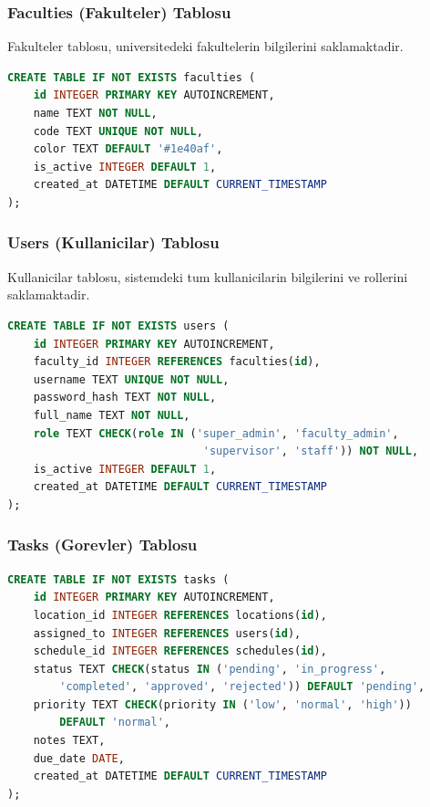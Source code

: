 \subsubsection{Faculties (Fakulteler) Tablosu}
\label{subsubsec:faculties}

Fakulteler tablosu, universitedeki fakultelerin bilgilerini 
saklamaktadir.

\begin{lstlisting}[language=SQL, caption={Faculties Tablosu Semasi}]
CREATE TABLE IF NOT EXISTS faculties (
    id INTEGER PRIMARY KEY AUTOINCREMENT,
    name TEXT NOT NULL,
    code TEXT UNIQUE NOT NULL,
    color TEXT DEFAULT '#1e40af',
    is_active INTEGER DEFAULT 1,
    created_at DATETIME DEFAULT CURRENT_TIMESTAMP
);
\end{lstlisting}

\subsubsection{Users (Kullanicilar) Tablosu}
\label{subsubsec:users}

Kullanicilar tablosu, sistemdeki tum kullanicilarin bilgilerini 
ve rollerini saklamaktadir.

\begin{lstlisting}[language=SQL, caption={Users Tablosu Semasi}]
CREATE TABLE IF NOT EXISTS users (
    id INTEGER PRIMARY KEY AUTOINCREMENT,
    faculty_id INTEGER REFERENCES faculties(id),
    username TEXT UNIQUE NOT NULL,
    password_hash TEXT NOT NULL,
    full_name TEXT NOT NULL,
    role TEXT CHECK(role IN ('super_admin', 'faculty_admin', 
                              'supervisor', 'staff')) NOT NULL,
    is_active INTEGER DEFAULT 1,
    created_at DATETIME DEFAULT CURRENT_TIMESTAMP
);
\end{lstlisting}

\subsubsection{Tasks (Gorevler) Tablosu}
\label{subsubsec:tasks}

\begin{lstlisting}[language=SQL, caption={Tasks Tablosu Semasi}]
CREATE TABLE IF NOT EXISTS tasks (
    id INTEGER PRIMARY KEY AUTOINCREMENT,
    location_id INTEGER REFERENCES locations(id),
    assigned_to INTEGER REFERENCES users(id),
    schedule_id INTEGER REFERENCES schedules(id),
    status TEXT CHECK(status IN ('pending', 'in_progress', 
        'completed', 'approved', 'rejected')) DEFAULT 'pending',
    priority TEXT CHECK(priority IN ('low', 'normal', 'high')) 
        DEFAULT 'normal',
    notes TEXT,
    due_date DATE,
    created_at DATETIME DEFAULT CURRENT_TIMESTAMP
);
\end{lstlisting}

